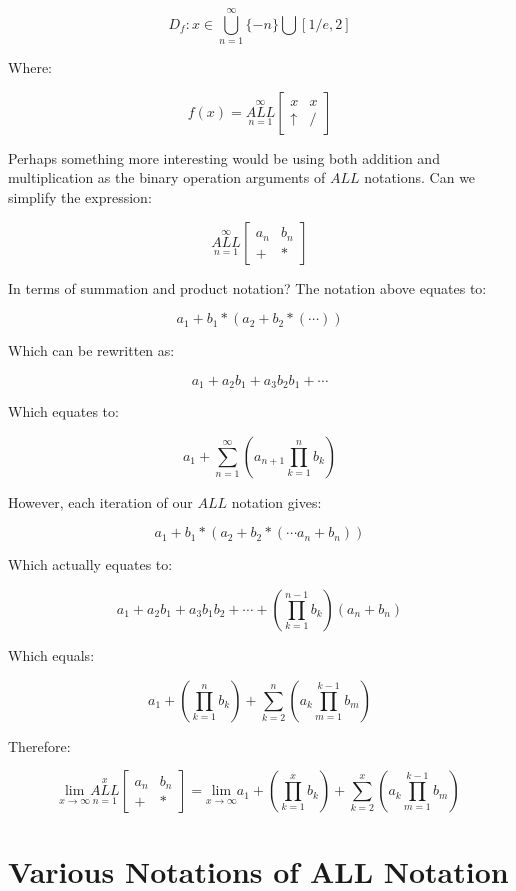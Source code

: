 \documentclass{article}
\begin{document}
$$D_f: x\in \underset{n=1}{\overset{\infty}{\bigcup}}\{-n\} \bigcup [1/e,2] $$

Where:

$$f(x)=\underset{n=1}{\overset{\infty}{ALL}} \begin{bmatrix}
x & x \\
\uparrow & /
\end{bmatrix}$$

Perhaps something more interesting would be using both addition and multiplication as the binary operation arguments of $ALL$ notations. Can we simplify the expression:

$$\underset{n=1}{\overset{\infty}{ALL}} \begin{bmatrix}
a_n & b_n \\
+ & *
\end{bmatrix}$$

In terms of summation and product notation? The notation above equates to:

$$a_1+b_1*(a_2+b_2*(\cdots))$$

Which can be rewritten as:

$$a_1+a_2b_1+a_3b_2b_1+\cdots$$

Which equates to:

$$ a_1+\underset{n=1}{\overset{\infty}{\sum}} (a_{n+1} \underset{k=1}{\overset{n}{\prod}} b_{k}) $$

However, each iteration of our $ALL$ notation gives:

$$a_1+b_1*(a_2+b_2*(\cdots a_n+b_n))$$

Which actually equates to:

$$a_1+a_2b_1+a_3b_1b_2+\cdots +(\underset{k=1}{\overset{n-1}{\prod}} b_{k})(a_n+b_n)$$

Which equals:

$$a_1 + (\underset{k=1}{\overset{n}{\prod}} b_{k})+\underset{k=2}{\overset{n}{\sum}} (a_{k} \underset{m=1}{\overset{k-1}{\prod}} b_{m})$$

Therefore:

$$\underset{x\xrightarrow{}\infty}{\text{lim}}\underset{n=1}{\overset{x}{ALL}} \begin{bmatrix}
a_n & b_n \\
+ & *
\end{bmatrix}=\underset{x\xrightarrow{}\infty}{\text{lim}} a_1 + (\underset{k=1}{\overset{x}{\prod}} b_{k})+\underset{k=2}{\overset{x}{\sum}} (a_{k} \underset{m=1}{\overset{k-1}{\prod}} b_{m})$$

\section{Various Notations of ALL Notation}
\end{document}
